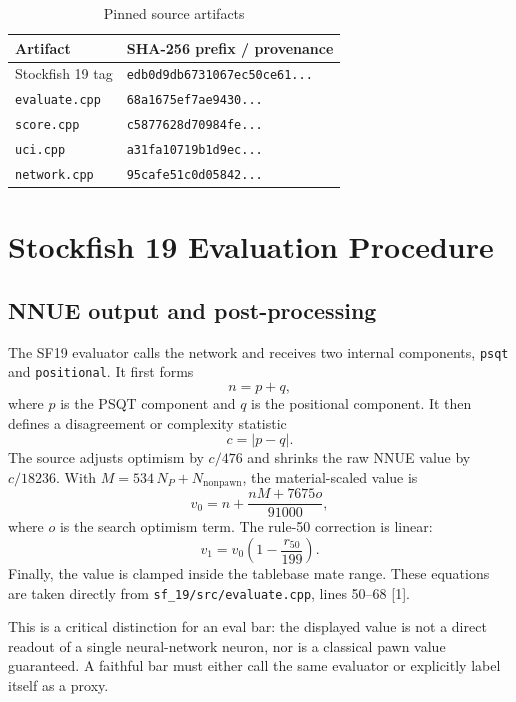 \documentclass[10pt,conference]{IEEEtran}
\begin{document}
\begin{table}[t]
\centering
\caption{Pinned source artifacts}
\label{tab:artifacts}
\begin{tabular}{ll}
\toprule
Artifact & SHA-256 prefix / provenance\\
\midrule
Stockfish 19 tag & \texttt{edb0d9db6731067ec50ce61...}\\
\texttt{evaluate.cpp} & \texttt{68a1675ef7ae9430...}\\
\texttt{score.cpp} & \texttt{c5877628d70984fe...}\\
\texttt{uci.cpp} & \texttt{a31fa10719b1d9ec...}\\
\texttt{network.cpp} & \texttt{95cafe51c0d05842...}\\
\bottomrule
\end{tabular}
\end{table}

\section{Stockfish 19 Evaluation Procedure}
\subsection{NNUE output and post-processing}
The SF19 evaluator calls the network and receives two internal components, \texttt{psqt} and \texttt{positional}. It first forms
\begin{equation}
 n = p + q,
\end{equation}
where $p$ is the PSQT component and $q$ is the positional component. It then defines a disagreement or complexity statistic
\begin{equation}
 c = |p-q|.
\end{equation}
The source adjusts optimism by $c/476$ and shrinks the raw NNUE value by $c/18236$. With $M=534\,N_P+N_{\mathrm{nonpawn}}$, the material-scaled value is
\begin{equation}
 v_0 = n + \frac{nM+7675o}{91000},
\end{equation}
where $o$ is the search optimism term. The rule-50 correction is linear:
\begin{equation}
 v_1 = v_0\left(1-\frac{r_{50}}{199}\right).
\end{equation}
Finally, the value is clamped inside the tablebase mate range. These equations are taken directly from \texttt{sf\_19/src/evaluate.cpp}, lines 50--68 [1].

This is a critical distinction for an eval bar: the displayed value is not a direct readout of a single neural-network neuron, nor is a classical pawn value guaranteed. A faithful bar must either call the same evaluator or explicitly label itself as a proxy.
\end{document}
